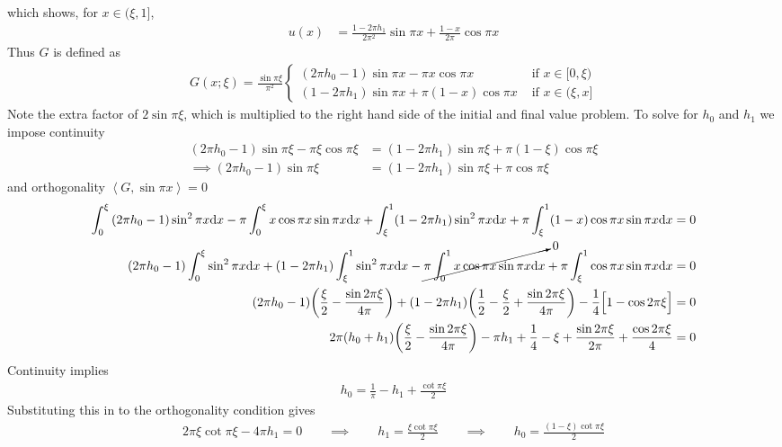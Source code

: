 \documentclass{article} %
\theoremstyle{plain}
\newcommand{\VEC}[2]{\left\langle #1, #2 \right\rangle}
\begin{document}
which shows, for $x \in (\xi,1]$,
\begin{align*}
    u(x) &= \frac{1 - 2\pi h_1}{2\pi^2}\sin \pi x + \frac{1-x}{2\pi}\cos\pi x
\end{align*}
Thus $G$ is defined as
\begin{align*}
    G(x;\xi) = \frac{\sin\pi\xi}{\pi^2}\begin{cases}
        (2\pi h_0 - 1)\sin \pi x - \pi x\cos\pi x & \text{ if } x \in [0,\xi) \\[.3cm]
        (1 - 2\pi h_1)\sin \pi x + \pi(1-x)\cos\pi x & \text{ if } x \in (\xi,x]
    \end{cases}
\end{align*}
Note the extra factor of $2\sin\pi\xi$, which is multiplied to the right hand side of the initial and final value problem.  To solve for $h_0$ and $h_1$ we impose continuity
\begin{align*}
    (2\pi h_0 - 1)\sin\pi \xi - \pi \xi\cos\pi \xi &= (1 - 2\pi h_1)\sin\pi \xi + \pi (1 - \xi)\cos\pi \xi \\
    \implies (2\pi h_0 - 1)\sin\pi\xi &= (1 - 2\pi h_1)\sin\pi\xi + \pi\cos\pi\xi
\end{align*}
and orthogonality $\VEC{G}{\sin\pi x} = 0$
\begin{align*}
    \int_0^\xi \qty(2\pi h_0 - 1)\sin^2\pi x \dd x - \pi\int_0^\xi x\cos\pi x\sin\pi x\dd x + \int_\xi^1 (1 - 2\pi h_1)\sin^2\pi x \dd x + \pi\int_\xi^1 (1 - x)\cos\pi x\sin\pi x\dd x &= 0 \\
    \qty(2\pi h_0 - 1)\int_0^\xi \sin^2\pi x \dd x + (1 - 2\pi h_1)\int_\xi^1 \sin^2\pi x \dd x - \cancelto{0}{\pi\int_0^1 x\cos\pi x\sin\pi x\dd x} + \pi\int_\xi^1\cos\pi x\sin\pi x\dd x &= 0 \\
    (2\pi h_0 - 1)\qty(\frac{\xi}{2} - \frac{\sin 2\pi\xi}{4\pi}) + (1 - 2\pi h_1)\qty(\frac{1}{2} - \frac{\xi}{2} + \frac{\sin 2\pi\xi}{4\pi}) - \frac{1}{4}\Big[1 - \cos 2\pi \xi\Big] &= 0 \\
    2\pi(h_0 + h_1)\qty(\frac{\xi}{2} - \frac{\sin 2\pi\xi}{4\pi}) - \pi h_1 + \frac{1}{4} - \xi + \frac{\sin 2\pi\xi}{2\pi} + \frac{\cos 2\pi\xi}{4} &= 0
\end{align*}
Continuity implies
\begin{align*}
    h_0 = \frac{1}{\pi} - h_1 + \frac{\cot \pi \xi}{2}
\end{align*}
Substituting this in to the orthogonality condition gives
\begin{align*}
    2\pi\xi\cot\pi\xi - 4\pi h_1 = 0 \qquad \implies \qquad h_1 = \frac{\xi\cot\pi\xi}{2} \qquad \implies \qquad h_0 = \frac{(1-\xi)\cot\pi\xi}{2}
\end{align*}
\end{document}
